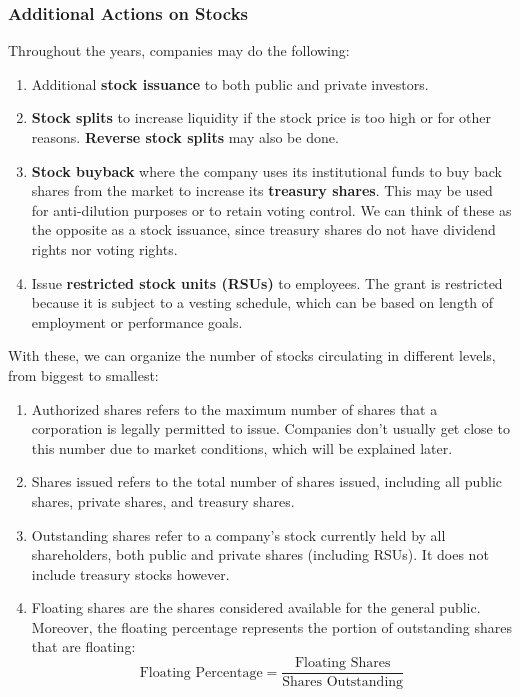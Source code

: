 \documentclass{article}
\begin{document}
  \subsubsection{Additional Actions on Stocks}
  Throughout the years, companies may do the following: 
  \begin{enumerate}
      \item Additional \textbf{stock issuance} to both public and private investors. 
      \item \textbf{Stock splits} to increase liquidity if the stock price is too high or for other reasons. \textbf{Reverse stock splits} may also be done.
      \item \textbf{Stock buyback} where the company uses its institutional funds to buy back shares from the market to increase its \textbf{treasury shares}. This may be used for anti-dilution purposes or to retain voting control. We can think of these as the opposite as a stock issuance, since treasury shares do not have dividend rights nor voting rights. 
      \item Issue \textbf{restricted stock units (RSUs)} to employees. The grant is restricted because it is subject to a vesting schedule, which can be based on length of employment or performance goals.
  \end{enumerate}
  With these, we can organize the number of stocks circulating in different levels, from biggest to smallest:
  \begin{enumerate}
      \item Authorized shares refers to the maximum number of shares that a corporation is legally permitted to issue. Companies don't usually get close to this number due to market conditions, which will be explained later. 
      \item Shares issued refers to the total number of shares issued, including all public shares, private shares, and treasury shares. 
      \item Outstanding shares refer to a company's stock currently held by all shareholders, both public and private shares (including RSUs). It does not include treasury stocks however. 
      \item Floating shares are the shares considered available for the general public. Moreover, the floating percentage represents the portion of outstanding shares that are floating: 
      \[\text{Floating Percentage} = \frac{\text{Floating Shares}}{\text{Shares Outstanding}}\]
  \end{enumerate}
\end{document}
